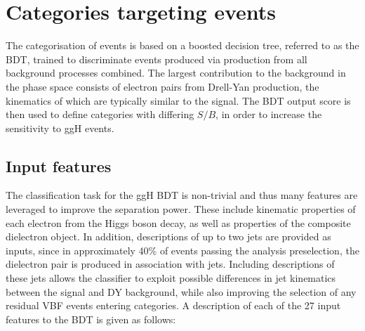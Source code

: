 
\section{Categories targeting \ggH events}
\label{subsec:ggh_categorisation}

The categorisation of \ggH events is based on a boosted decision tree, referred to as the \ggH BDT, trained to discriminate events produced via \ggH production from all background processes combined. The largest contribution to the background in the \ggH phase space consists of electron pairs from Drell-Yan production, the kinematics of which are typically similar to the \ggH signal. The BDT output score is then used to define categories with differing $S/B$, in order to increase the sensitivity to ggH events.

\subsection{Input features}

The classification task for the ggH BDT is non-trivial and thus many features are leveraged to improve the separation power. These include kinematic properties of each electron from the Higgs boson decay, as well as properties of the composite dielectron object. In addition, descriptions of up to two jets are provided as inputs, since in approximately 40\% of events passing the analysis preselection, the dielectron pair is produced in association with jets. Including descriptions of these jets allows the classifier to exploit possible differences in jet kinematics between the \ggH signal and DY background, while also improving the selection of any residual VBF events entering \ggH categories. A description of each of the 27 input features to the \ggH BDT is given as follows:


